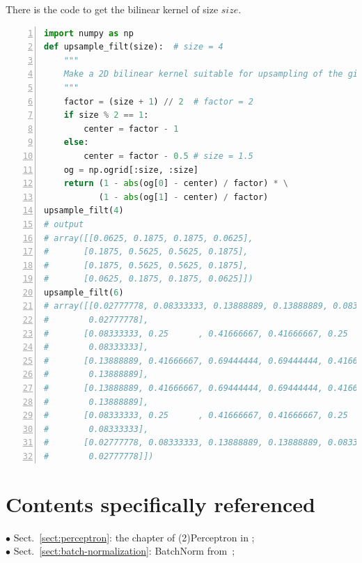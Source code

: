 \documentclass[10pt,onecolumn]{book}
\begin{document}
There is the code to get the bilinear kernel of size $size$.

\begin{tcolorbox}  
\begin{lstlisting}[language={Python},numbers=left,numberstyle=\tiny,%frame=shadowbox,  
   rulesepcolor=\color{red!20!green!20!blue!20},  
   keywordstyle=\color{blue!70!black},  
   commentstyle=\color{blue!90!},  
   basicstyle=\ttfamily]  
import numpy as np
def upsample_filt(size):  # size = 4 
    """
    Make a 2D bilinear kernel suitable for upsampling of the given (h, w) size.
    """
    factor = (size + 1) // 2  # factor = 2
    if size % 2 == 1:
        center = factor - 1  
    else:
        center = factor - 0.5 # size = 1.5
    og = np.ogrid[:size, :size] 
    return (1 - abs(og[0] - center) / factor) * \
           (1 - abs(og[1] - center) / factor)
upsample_filt(4)
# output
# array([[0.0625, 0.1875, 0.1875, 0.0625],
#       [0.1875, 0.5625, 0.5625, 0.1875],
#       [0.1875, 0.5625, 0.5625, 0.1875],
#       [0.0625, 0.1875, 0.1875, 0.0625]])
upsample_filt(6)
# array([[0.02777778, 0.08333333, 0.13888889, 0.13888889, 0.08333333,
#        0.02777778],
#       [0.08333333, 0.25      , 0.41666667, 0.41666667, 0.25      ,
#        0.08333333],
#       [0.13888889, 0.41666667, 0.69444444, 0.69444444, 0.41666667,
#        0.13888889],
#       [0.13888889, 0.41666667, 0.69444444, 0.69444444, 0.41666667,
#        0.13888889],
#       [0.08333333, 0.25      , 0.41666667, 0.41666667, 0.25      ,
#        0.08333333],
#       [0.02777778, 0.08333333, 0.13888889, 0.13888889, 0.08333333,
#        0.02777778]])
\end{lstlisting} 
\end{tcolorbox}


\chapter{Contents specifically referenced}
\noindent $\bullet$ Sect.~\ref{sect:perceptron}: the chapter of (2)Perceptron in \cite{hangli2012}; \\
$\bullet$ Sect.~\ref{sect:batch-normalization}: BatchNorm from~\cite{ioffe2015batch};

{\small


}
\end{document}
